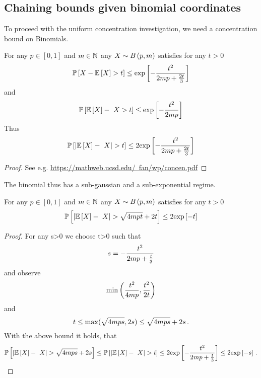 \subsection{Chaining bounds given binomial coordinates}\label{sec:chainingWidthBounds}

To proceed with the uniform concentration investigation, we need a concentration bound on Binomials.

\begin{theorem}
	For any $p\in[0,1]$ and $m\in\mathbb{N}$ any $X \sim B\left(p,m\right)$ satisfies for any $t>0$
		\[ \mathbb{P}\left[X-\mathbb{E}\left[X\right] > t\right]  \leq \mathrm{exp}\left[- \frac{t^2}{2m p + \frac{2t}{3}} \right] \]
	and
		\[ \probat{\expectationof{X} - X > t}  \leq \expof{- \frac{t^2}{2\datanum p}} \]
	Thus
		\[ \probat{|\expectationof{X} - X| > t} \leq  2 \expof{- \frac{t^2}{2\datanum p + \frac{2t}{3}} }  \]
\end{theorem}
\begin{proof}
	See e.g.
	\href{https://mathweb.ucsd.edu/~fan/wp/concen.pdf}{https://mathweb.ucsd.edu/~fan/wp/concen.pdf}
\end{proof}

The binomial thus has a sub-gaussian and a sub-exponential regime.

\begin{theorem}
	For any $p\in[0,1]$ and $m\in\mathbb{N}$ any $X \sim B\left(p,m\right)$ satisfies for any $t>0$
		\[ \probat{|\expectationof{X} - X| > \sqrt{4\datanum p t} + 2 t} \leq  2 \expof{- t }  \]
\end{theorem}
\begin{proof}
	For any s>0 we choose t>0 such that 
		\[ s = - \frac{t^2}{2m p + \frac{t}{3}}  \]
	and observe 
		\[ \min\left( \frac{t^2}{4m p},\frac{t^2}{2t} \right) \]
	and
		\[ t \leq \max(\sqrt{4m p s},2s) \leq  \sqrt{4m p s} + 2s \, . \]
	With the above bound it holds, that
		\[  \probat{|\expectationof{X} - X| >  \sqrt{4\datanum p s} + 2s}
		\leq \probat{|\expectationof{X} - X| > t}
		\leq 2 \expof{- \frac{t^2}{2\datanum p + \frac{t}{3}} } 
		\leq 2 \expof{-s} \, . \]
\end{proof}

